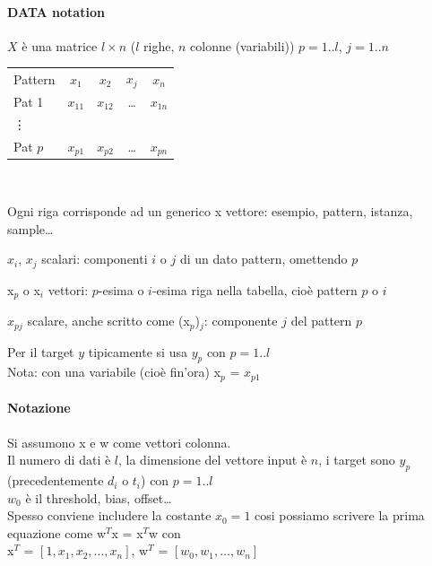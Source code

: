 \documentclass[10pt]{book}
\begin{document}
\paragraph{DATA notation} $X$ è una matrice $l \times n$ ($l$ righe, $n$ colonne (variabili)) $p = 1..l$, $j = 1..n$
\begin{multicols}{2}
\begin{center}
\begin{tabular}{l c c c c}
Pattern & $x_1$ & $x_2$ & $x_j$ & $x_n$\\
Pat 1 & $x_{11}$ & $x_{12}$ & \ldots& $x_{1n}$\\
\vdots\\
Pat $p$ & $x_{p1}$ & $x_{p2}$ & \ldots & $x_{pn}$\\
\end{tabular}\\
\end{center}

\begin{list}{}{}
	\item Ogni riga corrisponde ad un generico x vettore: esempio, pattern, istanza, sample\ldots
	\item $x_i$, $x_j$ scalari: componenti $i$ o $j$ di un dato pattern, omettendo $p$
	\item x$_p$ o x$_i$ vettori: $p$-esima o $i$-esima riga nella tabella, cioè pattern $p$ o $i$
	\item $x_{pj}$ scalare, anche scritto come (x$_p$)$_j$: componente $j$ del pattern $p$
	\item Per il target $y$ tipicamente si usa $y_p$ con $p = 1..l$\\
	Nota: con una variabile (cioè fin'ora) x$_p$ = $x_{p1}$
\end{list}
\end{multicols}
\paragraph{Notazione} Si assumono x e w come vettori colonna.\\
Il numero di dati è $l$, la dimensione del vettore input è $n$, i target sono $y_p$ (precedentemente $d_i$ o $t_i$) con $p=1..l$\\
$w_0$ è il threshold, bias, offset\ldots\\
Spesso conviene includere la costante $x_0 = 1$ cosi possiamo scrivere la prima equazione come w$^T$x = x$^T$w con\\
x$^T$ = $[1, x_1, x_2, \ldots, x_n]$, w$^T$ = $[w_0, w_1, \ldots, w_n]$
\end{document}
